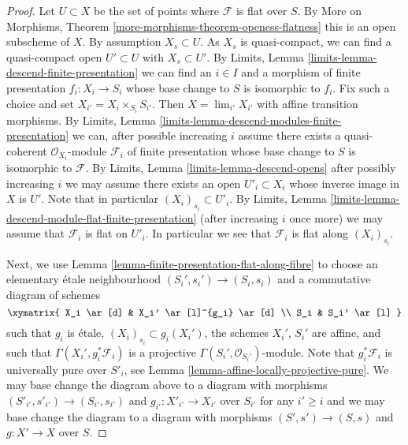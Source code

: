 \begin{proof}
Let $U \subset X$ be the set of points where $\mathcal{F}$ is
flat over $S$. By
More on Morphisms, Theorem \ref{more-morphisms-theorem-openess-flatness}
this is an open subscheme of $X$. By assumption $X_s \subset U$.
As $X_s$ is quasi-compact, we can find a quasi-compact open
$U' \subset U$ with $X_s \subset U'$. By
Limits, Lemma \ref{limits-lemma-descend-finite-presentation}
we can find an $i \in I$ and a morphism of finite presentation
$f_i : X_i \to S_i$ whose base change to $S$ is isomorphic to $f_i$.
Fix such a choice and set $X_{i'} = X_i \times_{S_i} S_{i'}$.
Then $X = \lim_{i'} X_{i'}$ with affine transition morphisms. By
Limits, Lemma \ref{limits-lemma-descend-modules-finite-presentation}
we can, after possible increasing $i$ assume there exists a
quasi-coherent $\mathcal{O}_{X_i}$-module $\mathcal{F}_i$
of finite presentation whose base change to $S$ is isomorphic to
$\mathcal{F}$. By
Limits, Lemma \ref{limits-lemma-descend-opens}
after possibly increasing $i$ we may assume there exists an
open $U'_i \subset X_i$ whose inverse image in $X$ is $U'$.
Note that in particular $(X_i)_{s_i} \subset U'_i$. By
Limits, Lemma \ref{limits-lemma-descend-module-flat-finite-presentation}
(after increasing $i$ once more)
we may assume that $\mathcal{F}_i$ is flat on $U'_i$.
In particular we see that $\mathcal{F}_i$ is flat along $(X_i)_{s_i}$.

\medskip\noindent
Next, we use
Lemma \ref{lemma-finite-presentation-flat-along-fibre}
to choose an elementary \'etale neighbourhood
$(S_i', s_i') \to (S_i, s_i)$ and a commutative diagram of schemes
$$
\xymatrix{
X_i \ar[d] & X_i' \ar[l]^{g_i} \ar[d] \\
S_i & S_i' \ar[l]
}
$$
such that $g_i$ is \'etale, $(X_i)_{s_i} \subset g_i(X_i')$, the schemes
$X_i'$, $S_i'$ are affine, and such that
$\Gamma(X_i', g_i^*\mathcal{F}_i)$ is a projective
$\Gamma(S_i', \mathcal{O}_{S_i'})$-module.
Note that $g_i^*\mathcal{F}_i$ is universally pure over $S'_i$, see
Lemma \ref{lemma-affine-locally-projective-pure}.
We may base change the diagram above to a diagram with morphisms
$(S'_{i'}, s'_{i'}) \to (S_{i'}, s_{i'})$ and
$g_{i'} : X'_{i'} \to X_{i'}$ over $S_{i'}$
for any $i' \geq i$ and we may base change the diagram to a diagram
with morphisms $(S', s') \to (S, s)$ and $g : X' \to X$ over $S$.


\end{proof}

